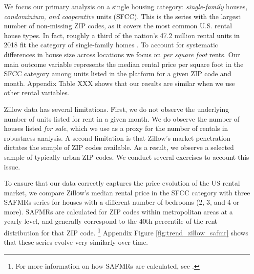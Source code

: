 We focus our primary analysis on a single housing category:
\textit{single-family} houses, \textit{condominium, and cooperative} units (SFCC).
This is the series with the largest number of non-missing ZIP codes, as it 
covers the most common U.S. rental house types.
In fact, roughly a third of the nation's 47.2 million rental units in 2018 fit 
the category of single-family homes \parencite{Fernald2020}.
%
%
%
To account for systematic differences in house size across locations we focus 
on \textit{per square foot} rents.
Our main outcome variable represents the median rental price per square foot in 
the SFCC category among units listed in the platform for a given ZIP code and 
month.
Appendix Table XXX shows that our results are similar when we use other rental 
variables.
%
%

Zillow data has several limitations.
First, we do not observe the underlying number of units listed for rent in a 
given month.
We do observe the number of houses listed \textit{for sale}, which we use as a
proxy for the number of rentals in robustness analysis.
A second limitation is that Zillow's market penetration dictates the sample of 
ZIP codes available.
As a result, we observe a selected sample of typically urban ZIP codes.
%
% 
%
We conduct several exercises to account this issue.

To ensure that our data correctly captures the price evolution of the US rental 
market, we compare 
Zillow's median rental price in the SFCC category with 
three SAFMRs series for houses with a different number of bedrooms (2, 3, and 
4 or more).
SAFMRs are calculated for ZIP codes within metropolitan areas at a yearly level, 
and generally correspond to the 40th percentile of the rent distribution for 
that ZIP code.%
\footnote{For more information on how SAFMRs are calculated, see 
\textcite[][page 41641]{hudPreamble}.}
Appendix Figure \ref{fig:trend_zillow_safmr} shows that these series evolve
very similarly over time.

